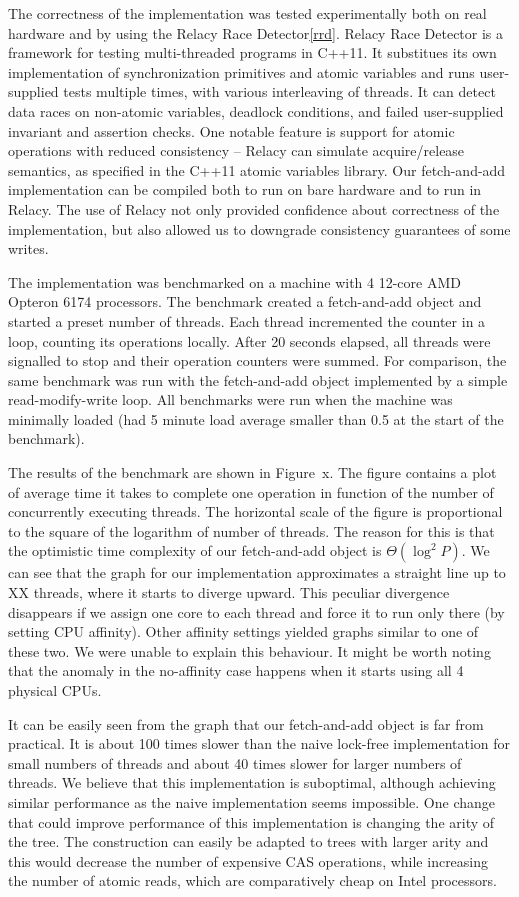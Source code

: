 \documentclass[a4paper,11pt]{article}
\begin{document}
The correctness of the implementation was tested experimentally both on real hardware and by using the Relacy Race Detector\ref{rrd}. Relacy Race Detector is a framework for testing multi-threaded programs in C++11.
It substitues its own
implementation of synchronization primitives and atomic variables and runs user-supplied tests multiple times, with various interleaving of threads.
It can detect data races on non-atomic variables, deadlock conditions, and failed user-supplied invariant and assertion
checks. One notable feature is support for atomic operations with reduced consistency -- Relacy can simulate acquire/release semantics, as specified in the C++11 atomic variables library.
Our fetch-and-add implementation can be compiled both to run on bare hardware and to run in Relacy. The use of Relacy not only provided confidence about correctness of the implementation, but also allowed us to downgrade
consistency guarantees of some writes.


The implementation was benchmarked on a machine with 4 12-core AMD Opteron 6174 processors.
The benchmark created a fetch-and-add object and started a preset number of threads. Each thread incremented the counter in a loop, counting its operations locally. After 20 seconds elapsed, all threads were signalled
to stop and their operation counters were summed. For comparison, the same benchmark was run with the fetch-and-add object implemented by a simple read-modify-write loop. All benchmarks were run when the machine was
minimally loaded (had 5 minute load average smaller than 0.5 at the start of the benchmark).

The results of the benchmark are shown in Figure~x. The figure contains a plot of average time it takes to complete one operation in function of the number of concurrently executing threads.
The horizontal scale of the figure is proportional to the square of the logarithm of number of threads. The reason for this is that the optimistic time complexity
of our fetch-and-add object is $\Theta(\log^2 P)$. We can see that the graph for our implementation approximates a straight line up to XX threads, where it starts to diverge upward. This peculiar divergence disappears
if we assign one core to each thread and force it to run only there (by setting CPU affinity). Other affinity settings yielded graphs similar to one of these two. We were unable to explain this behaviour. It might
be worth noting that the anomaly in the no-affinity case happens when it starts using all 4 physical CPUs.

It can be easily seen from the graph that our fetch-and-add object is far from practical. It is about 100 times slower than the naive lock-free implementation for small numbers of threads and about 40 times slower
for larger numbers of threads. We believe that this implementation is suboptimal, although achieving similar performance as the naive implementation seems impossible. One change that could improve performance
of this implementation is changing the arity of the tree. The construction can easily be adapted to trees with larger arity and this would decrease the number of expensive CAS operations, while increasing the number
of atomic reads, which are comparatively cheap on Intel processors.
\end{document}
